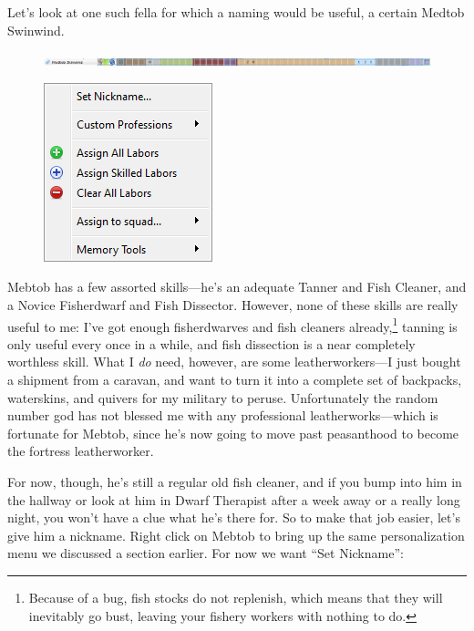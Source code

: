 \documentclass[]{article}
\begin{document}
Let's look at one such fella for which a naming would be useful, a certain Medtob Swinwind.
\begin{figure}[h!]
\centering
\includegraphics[width=\linewidth]{Sec2Fig13}
\end{figure}

\begin{figure}
  \begin{center}
    \includegraphics{Sec2Fig14}
  \end{center}
\end{figure}
Mebtob has a few assorted skills---he's an adequate Tanner and Fish Cleaner, and a Novice Fisherdwarf and
Fish Dissector. However, none of these skills are really useful to me: I've got enough fisherdwarves and
fish cleaners already,\footnote{Because of a bug, fish stocks do not replenish, which means that they
will inevitably go bust, leaving your fishery workers with nothing to do.} tanning is only useful every
once in a while, and fish dissection is a near completely worthless skill. What I \emph{do} need,
however, are some leatherworkers---I just bought a shipment from a caravan, and want to turn it into a
complete set of backpacks, waterskins, and quivers for my military to peruse. Unfortunately the random
number god has not blessed me with any professional leatherworks---which is fortunate for Mebtob, since
he's now going to move past peasanthood to become the fortress leatherworker.

For now, though, he's still a regular old fish cleaner, and if you bump into him in the hallway or look
at him in Dwarf Therapist after a week away or a really long night, you won't have a clue what he's there
for. So to make that job easier, let's give him a nickname. Right click on Mebtob to bring up the same
personalization menu we discussed a section earlier. For now we want ``Set Nickname'':
\newpage
\end{document}
